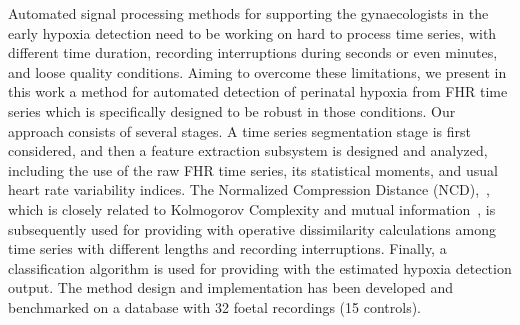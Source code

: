 Automated signal processing methods for supporting the gynaecologists in the early hypoxia detection need to be working on hard to process time series, with different time duration, recording interruptions during seconds or even minutes, and loose quality conditions. Aiming to overcome these limitations, we present in this work a method for automated detection of perinatal hypoxia from FHR time series which is specifically designed to be robust in those conditions.  Our  approach  consists of several stages.  A time series segmentation stage is first considered, and then a feature extraction subsystem is designed and analyzed, including the use of the raw FHR time series, its statistical moments, and usual heart rate variability indices. The  Normalized Compression Distance (NCD),~\cite{Li2004},  which is closely related to Kolmogorov Complexity and mutual information~\cite{cover91_information_theory}, is subsequently used for providing with operative dissimilarity calculations among  time series with different lengths and recording interruptions. Finally, a  classification algorithm is used for providing with the estimated hypoxia detection output.  The method design and implementation has been developed and benchmarked on a database with 32 foetal recordings (15 controls).
%
